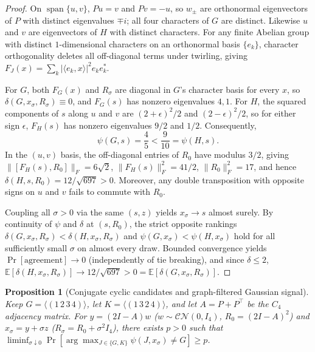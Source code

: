 \documentclass[11pt]{article}
\theoremstyle{plain}
\newtheorem{proposition}[theorem]{Proposition}
\theoremstyle{definition}
\theoremstyle{remark}
\DeclareMathOperator{\spn}{span}
\begin{document}
\begin{proof}
On $\spn\{u, v\}$, $Pu = v$ and $Pv = -u$, so $w_\pm$ are orthonormal eigenvectors of $P$ with distinct eigenvalues $\mp i$; all four characters of $G$ are distinct. Likewise $u$ and $v$ are eigenvectors of $H$ with distinct characters. For any finite Abelian group with distinct $1$-dimensional characters on an orthonormal basis $\{e_k\}$, character orthogonality deletes all off-diagonal terms under twirling, giving $F_J(x) = \sum_k |\langle e_k, x\rangle|^2 e_k e_k^*$.

For $G$, both $F_G(x)$ and $R_\sigma$ are diagonal in $G$'s character basis for every $x$, so $\delta(G, x_\sigma, R_\sigma) \equiv 0$, and $F_G(s)$ has nonzero eigenvalues $4, 1$. For $H$, the squared components of $s$ along $u$ and $v$ are $(2+\epsilon)^2/2$ and $(2-\epsilon)^2/2$, so for either sign $\epsilon$, $F_H(s)$ has nonzero eigenvalues $9/2$ and $1/2$. Consequently,
\[
\psi(G, s) = \frac{4}{5} < \frac{9}{10} = \psi(H, s).
\]
In the $(u, v)$ basis, the off-diagonal entries of $R_0$ have modulus $3/2$, giving $\|[F_H(s), R_0]\|_F = 6\sqrt{2}$, $\|F_H(s)\|_F^2 = 41/2$, $\|R_0\|_F^2 = 17$, and hence $\delta(H, s, R_0) = 12/\sqrt{697} > 0$. Moreover, any double transposition with opposite signs on $u$ and $v$ fails to commute with $R_0$.

Coupling all $\sigma > 0$ via the same $(s, z)$ yields $x_\sigma \to s$ almost surely. By continuity of $\psi$ and $\delta$ at $(s, R_0)$, the strict opposite rankings $\delta(G, x_\sigma, R_\sigma) < \delta(H, x_\sigma, R_\sigma)$ and $\psi(G, x_\sigma) < \psi(H, x_\sigma)$ hold for all sufficiently small $\sigma$ on almost every draw. Bounded convergence yields $\Pr[\text{agreement}] \to 0$ (independently of tie breaking), and since $\delta \le 2$, $\mathbb{E}[\delta(H, x_\sigma, R_\sigma)] \to 12/\sqrt{697} > 0 = \mathbb{E}[\delta(G, x_\sigma, R_\sigma)]$.
\end{proof}

\begin{proposition}[Conjugate cyclic candidates and graph-filtered Gaussian signal]\label{prop:blind-c4}
Keep $G = \langle(1\,2\,3\,4)\rangle$, let $K = \langle(1\,3\,2\,4)\rangle$, and let $A = P + P^\top$ be the $C_4$ adjacency matrix. For $y = (2I - A)w$ ($w \sim \mathcal{CN}(0, I_4)$, $R_0 = (2I - A)^2$) and $x_\sigma = y + \sigma z$ ($R_\sigma = R_0 + \sigma^2 I_4$), there exists $p > 0$ such that $\liminf_{\sigma \downarrow 0} \Pr[\arg\max_{J \in \{G, K\}} \psi(J, x_\sigma) \neq G] \ge p$.
\end{proposition}
\end{document}
